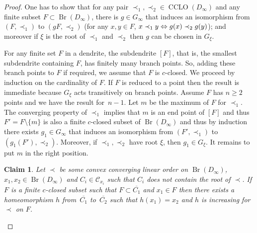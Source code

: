 \documentclass[JEP,XML,SOM,Unicode,NoFloatCountersInSection]{cedram}
\newcommand\ssi{\mathchoice{\iff}{\Leftrightarrow}{\Leftrightarrow}{\Leftrightarrow}}
\let\mathcal\mathscr
\theoremstyle{plain}
\newtheorem*{claim*}{Claim}
\theoremstyle{definition}
\newcommand{\cC}{\mathcal{C}}
\DeclareMathOperator{\Br}{Br}
\DeclareMathOperator{\CLO}{CCLO}
\begin{document}
\begin{proof}One has to show that for any pair $\prec_1,{\prec_2}\in\CLO(D_\infty)$ and any finite subset $F\subset\Br(D_\infty)$, there is $g\in G_\infty$ that induces an isomorphism from $(F,\prec_1)$ to $(gF,\prec_2)$ (\ie for any $x,y\in F$, $x\prec_1 y\ssi g(x)\prec_2g(y)$); and moreover if $\xi$ is the root of $\prec_1$ and $\prec_2$ then $g$ can be chosen in $G_{\xi}$.

For any finite set $F$ in a dendrite, the subdendrite $[F]$, that is, the smallest subdendrite containing $F$, has finitely many branch points. So, adding these branch points to $F$ if required, we assume that $F$ is $c$-closed. We proceed by induction on the cardinality of $F$. If $F$ is reduced to a point then the result is immediate because $G_{\xi}$ acts transitively on branch points. Assume $F$ has $n\geq2$ points and we have the result for~$n-1$. Let $m$ be the maximum of $F$ for $\prec_1$. The converging property of $\prec_1$ implies that $m$ is an end point of $[F]$ and thus $F'=F\setminus\{m\}$ is also a finite $c$-closed subset of $\Br(D_\infty)$ and thus by induction there exists $g_1\in G_\infty$ that induces an isomorphism from $(F',\prec_1)$ to $(g_1(F'),\prec_2)$. Moreover, if $\prec_1,\prec_2$ have root $\xi$, then $g_1\in G_{\xi}$. It remains to put $m$ in the right position.

\begin{claim*}
Let $\prec$ be some convex converging linear order on $\Br(D_\infty)$, $x_1,x_2\in\Br(D_\infty)$ and $C_i\in\cC_{x_i}$ such that $C_i$ does not contain the root of $\prec$. If $F$ is a finite $c$-closed subset such that $F\subset \overline{C_1}$ and $x_1\in F$ then there exists a homeomorphism $h$ from~$\overline{C_1}$ to~$\overline{C_2}$ such that $h(x_1)=x_2$ and $h$ is increasing for $\prec$ on $F$.
\end{claim*}


\end{proof}
\end{document}
